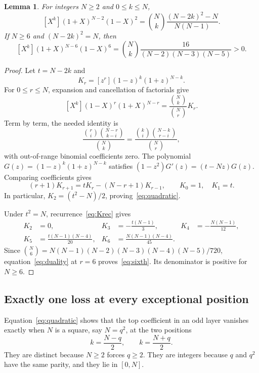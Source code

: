 \documentclass[11pt,a4paper]{article}
\newtheorem{lemma}[theorem]{Lemma}
\begin{document}
\begin{lemma}\label{lem:coeff}
For integers $N\ge2$ and $0\le k\le N$,
\begin{equation}\label{eq:quadratic}
 [X^k](1+X)^{N-2}(1-X)^2
 =\binom Nk\frac{(N-2k)^2-N}{N(N-1)}.
\end{equation}
If $N\ge6$ and $(N-2k)^2=N$, then
\begin{equation}\label{eq:sixth}
 [X^k](1+X)^{N-6}(1-X)^6
 =\binom Nk\frac{16}{(N-2)(N-3)(N-5)}>0.
\end{equation}
\end{lemma}
\begin{proof}
Let $t=N-2k$ and
\[
 K_r=[z^r](1-z)^k(1+z)^{N-k}.
\]
For $0\le r\le N$, expansion and cancellation of factorials give
\begin{equation}\label{eq:duality}
 [X^k](1-X)^r(1+X)^{N-r}
 =\frac{\binom Nk}{\binom Nr}K_r.
\end{equation}
Term by term, the needed identity is
\[
 \frac{\binom ri\binom{N-r}{k-i}}{\binom Nk}
 =\frac{\binom ki\binom{N-k}{r-i}}{\binom Nr},
\]
with out-of-range binomial coefficients zero.
The polynomial $G(z)=(1-z)^k(1+z)^{N-k}$ satisfies
$(1-z^2)G'(z)=(t-Nz)G(z)$. Comparing coefficients gives
\begin{equation}\label{eq:Krec}
 (r+1)K_{r+1}=tK_r-(N-r+1)K_{r-1},\qquad K_0=1,\quad K_1=t.
\end{equation}
In particular, $K_2=(t^2-N)/2$, proving~\eqref{eq:quadratic}.

Under $t^2=N$, recurrence~\eqref{eq:Krec} gives
\[
 \begin{aligned}
 K_2&=0,& K_3&=-\frac{t(N-1)}3,& K_4&=-\frac{N(N-1)}{12},\\
 K_5&=\frac{t(N-1)(N-4)}{20},&
 K_6&=\frac{N(N-1)(N-4)}{45}.
 \end{aligned}
\]
Since $\binom N6=N(N-1)(N-2)(N-3)(N-4)(N-5)/720$, equation~\eqref{eq:duality}
at $r=6$ proves~\eqref{eq:sixth}. Its denominator is positive for $N\ge6$.
\end{proof}

\subsection{Exactly one loss at every exceptional position}
Equation~\eqref{eq:quadratic} shows that the top coefficient in an odd
layer vanishes exactly when $N$ is a square, say $N=q^2$, at the two positions
\begin{equation}\label{eq:positions}
 k=\frac{N-q}{2},\qquad k=\frac{N+q}{2}.
\end{equation}
They are distinct because $N\ge2$ forces $q\ge2$. They are integers because
$q$ and $q^2$ have the same parity, and they lie in $[0,N]$.
\end{document}
